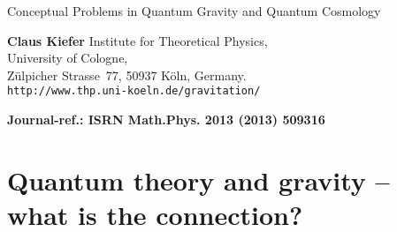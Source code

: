 \documentclass[12pt,a4paper]{article}
\begin{document}
\begin{titlepage}

\noindent
\begin{center}
\vspace*{1cm}

{\large Conceptual Problems in Quantum Gravity and Quantum Cosmology}   
  
\vskip 1cm

{\bf Claus Kiefer} 
\vskip 0.4cm
Institute for Theoretical Physics,\\ University of Cologne, \\
Z\"ulpicher Strasse~77,
50937 K\"oln, Germany.\\ {\tt http://www.thp.uni-koeln.de/gravitation/}
\vspace{1cm}


\begin{abstract}
The search for a consistent and empirically established quantum theory
of gravity is among the biggest open problems of fundamental
physics. The obstacles are of formal and of conceptual nature. Here, I
address the main conceptual problems, discuss their present
status and outline further directions of research. For this purpose,
the main current approaches to quantum 
gravity are briefly reviewed and compared. 
\end{abstract}

\vskip 1cm

{\bf Journal-ref.: ISRN Math.Phys. 2013 (2013) 509316}
      

\end{center}

\end{titlepage}


\section{Quantum theory and gravity -- what is the connection?}
\end{document}
